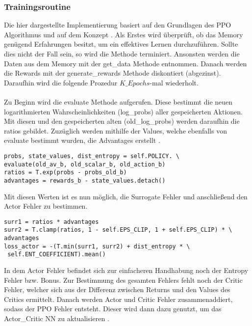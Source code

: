 \subsubsection{Trainingsroutine} \label{subsubsec:Implementierung_Trainingsroutine_PPO}
Die hier dargestellte Implementierung basiert auf den Grundlagen des PPO Algorithmus  und auf dem Konzept .
Als Erstes wird überprüft, ob das Memory genügend Erfahrungen besitzt, um ein effektives Lernen durchzuführen. Sollte dies nicht der Fall sein, so wird die Methode terminiert. 
Ansonsten werden die Daten aus dem Memory mit der get\_data Methode entnommen.
Danach werden die Rewards mit der generate\_rewards Methode diskontiert (abgezinst).\\
Daraufhin wird die folgende Prozedur $K\_Epochs$-mal wiederholt.\\
\\Zu Beginn wird die evaluate Methode aufgerufen. Diese bestimmt die neuen logarithmierten Wahrscheinlichkeiten (log\_probs) aller gespeicherten Aktionen. Mit diesen und den gespeicherten alten (old\_log\_probs) werden daraufhin die ratios gebildet.
Zuzüglich werden mithilfe der Values, welche ebenfalls von evaluate bestimmt wurden, die Advantages erstellt .
\begin{lstlisting}[caption=Bestimmung der Ratios und Advantages, label=code:Bestimmung_Ratio_Advantages, style=Python]
probs, state_values, dist_entropy = self.POLICY. \
evaluate(old_av_b, old_scalar_b, old_action_b)	
ratios = T.exp(probs - probs_old_b)	
advantages = rewards_b - state_values.detach()
\end{lstlisting}
Mit diesen Werten ist es nun möglich, die Surrogate Fehler und anschließend den Actor Fehler zu bestimmen.
\begin{lstlisting}[caption=Bestimmung des Surrogate und Actor Fehlers, label=code:Bestimmung_Surrogate_Losses, style=Python]
surr1 = ratios * advantages
surr2 = T.clamp(ratios, 1 - self.EPS_CLIP, 1 + self.EPS_CLIP) * \
advantages
loss_actor = -(T.min(surr1, surr2) + dist_entropy * \
 self.ENT_COEFFICIENT).mean()
\end{lstlisting}
In dem Actor Fehler befindet sich zur einfacheren Handhabung noch der Entropy Fehler bzw. Bonus.
Zur Bestimmung des gesamten Fehlers fehlt noch der Critic Fehler, welcher sich aus der Differenz zwischen Returns und den Values des Critics ermittelt.
Danach werden Actor und Critic Fehler zusammenaddiert, sodass der PPO Fehler entsteht. Dieser wird dann dazu genutzt, um das Actor\_Critic NN zu aktualisieren .
